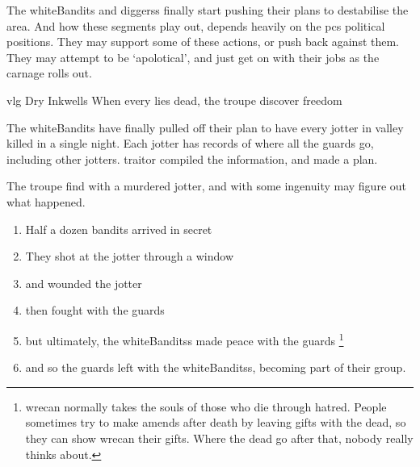 \label{risingTitles}

\noindent
The \gls{whiteBandits} and \glspl{diggers} finally start pushing their plans to destabilise the area.
And how these \glspl{segment} play out, depends heavily on the \glspl{pc} political positions.
They may support some of these actions, or push back against them.
They may attempt to be `apolotical', and just get on with their jobs as the carnage rolls out.

{\gls{vlg} Dry Inkwells}%
{When every  lies dead, the troupe discover freedom}%

\begin{exampletext}
  The \gls{whiteBandits} have finally pulled off their plan to have every \gls{jotter} in \gls{valley} killed in a single night.
  Each \gls{jotter} has records of where all the \glspl{guard} go, including other \glspl{jotter}.
  \Gls{traitor} compiled the information, and made a plan.
\end{exampletext}

The troupe find  with a murdered \gls{jotter}, and with some ingenuity may figure out what happened.

\begin{enumerate}
  \item
  Half a dozen bandits arrived in secret
  \item
  They shot at the \gls{jotter} through a window
  \item
  and wounded the \gls{jotter}
  \item
  then fought with the \glspl{guard}
  \item
  but ultimately, the \glspl{whiteBandits} made peace with the \glspl{guard}
  \footnote{\Gls{wrecan} normally takes the souls of those who die through hatred.  People sometimes try to make amends after death by leaving gifts with the dead, so they can show \gls{wrecan} their gifts.  Where the dead go after that, nobody really thinks about.}
  \item
  and so the \glspl{guard} left with the \glspl{whiteBandits}, becoming part of their group.
\end{enumerate}

